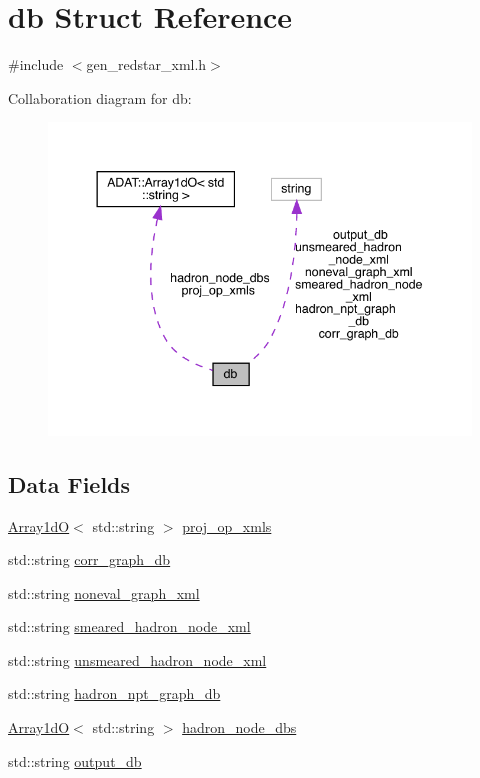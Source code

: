 \hypertarget{structdb}{}\section{db Struct Reference}
\label{structdb}


{\ttfamily \#include $<$gen\+\_\+redstar\+\_\+xml.\+h$>$}



Collaboration diagram for db\+:\nopagebreak
\begin{figure}[H]
\begin{center}
\leavevmode
\includegraphics[width=344pt]{df/dce/structdb__coll__graph}
\end{center}
\end{figure}
\subsection*{Data Fields}
\begin{DoxyCompactItemize}
\item 
\mbox{\hyperlink{classADAT_1_1Array1dO}{Array1dO}}$<$ std\+::string $>$ \mbox{\hyperlink{structdb_a418dc569af05ab376447a80b2e6f4362}{proj\+\_\+op\+\_\+xmls}}
\item 
std\+::string \mbox{\hyperlink{structdb_aa7f8d741272319f9df9214fecaecdb15}{corr\+\_\+graph\+\_\+db}}
\item 
std\+::string \mbox{\hyperlink{structdb_a6c0c1978e523ab65017a2a4a81379fad}{noneval\+\_\+graph\+\_\+xml}}
\item 
std\+::string \mbox{\hyperlink{structdb_a552ba1dba16b0c5b39f50e8cac0aec08}{smeared\+\_\+hadron\+\_\+node\+\_\+xml}}
\item 
std\+::string \mbox{\hyperlink{structdb_af07d40bcc407b2e0b9d066ab85e9ab61}{unsmeared\+\_\+hadron\+\_\+node\+\_\+xml}}
\item 
std\+::string \mbox{\hyperlink{structdb_a8a43018c0e547b50fe9b9c665f48f510}{hadron\+\_\+npt\+\_\+graph\+\_\+db}}
\item 
\mbox{\hyperlink{classADAT_1_1Array1dO}{Array1dO}}$<$ std\+::string $>$ \mbox{\hyperlink{structdb_a4eeb1411a764c684be7c618b17881f55}{hadron\+\_\+node\+\_\+dbs}}
\item 
std\+::string \mbox{\hyperlink{structdb_a7898d18eb54db0640a21d8ea26ff008e}{output\+\_\+db}}
\end{DoxyCompactItemize}



